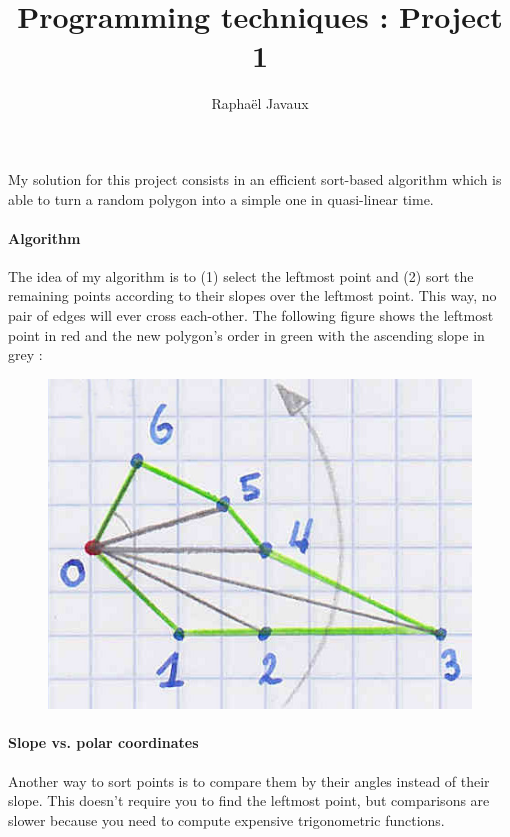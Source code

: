 \documentclass[a4paper]{article}
\title{Programming techniques : Project 1}
\author{Raphaël Javaux}
\date{}
\begin{document}
\maketitle

    \paragraph{} My solution for this project consists in an efficient 
sort-based algorithm which is able to turn a random polygon into a simple one
in quasi-linear time.

    \paragraph{Algorithm} The idea of my algorithm is to (1) select the 
leftmost point and (2) sort the remaining points according to their slopes over
the leftmost point. This way, no pair of edges will ever cross each-other.
The following figure shows the leftmost point in red and the new polygon's order
in green with the ascending slope in grey :

    \begin{figure}[h]
        \centering
        \includegraphics{schema.jpg}
    \end{figure}

    \paragraph{Slope vs. polar coordinates} Another way to sort points is to
compare them by their angles instead of their slope. This doesn't require you to
find the leftmost point, but comparisons are slower because you need to compute
expensive trigonometric functions.
\end{document}
